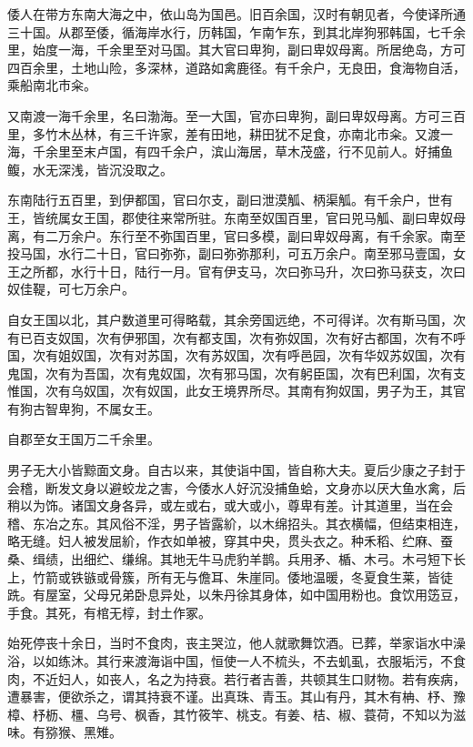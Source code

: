 \documentclass[12pt,UTF8]{ctexbook}
\begin{document}
倭人在带方东南大海之中，依山岛为国邑。旧百余国，汉时有朝见者，今使译所通三十国。从郡至倭，循海岸水行，历韩国，乍南乍东，到其北岸狗邪韩国，七千余里，始度一海，千余里至对马国。其大官曰卑狗，副曰卑奴母离。所居绝岛，方可四百余里，土地山险，多深林，道路如禽鹿径。有千余户，无良田，食海物自活，乘船南北市籴。

又南渡一海千余里，名曰渤海。至一大国，官亦曰卑狗，副曰卑奴母离。方可三百里，多竹木丛林，有三千许家，差有田地，耕田犹不足食，亦南北市籴。又渡一海，千余里至末卢国，有四千余户，滨山海居，草木茂盛，行不见前人。好捕鱼鳆，水无深浅，皆沉没取之。

东南陆行五百里，到伊都国，官曰尔支，副曰泄漠觚、柄渠觚。有千余户，世有王，皆统属女王国，郡使往来常所驻。东南至奴国百里，官曰兕马觚、副曰卑奴母离，有二万余户。东行至不弥国百里，官曰多模，副曰卑奴母离，有千余家。南至投马国，水行二十日，官曰弥弥，副曰弥弥那利，可五万余户。南至邪马壹国，女王之所都，水行十日，陆行一月。官有伊支马，次曰弥马升，次曰弥马获支，次曰奴佳鞮，可七万余户。

自女王国以北，其户数道里可得略载，其余旁国远绝，不可得详。次有斯马国，次有已百支奴国，次有伊邪国，次有都支国，次有弥奴国，次有好古都国，次有不呼国，次有姐奴国，次有对苏国，次有苏奴国，次有呼邑园，次有华奴苏奴国，次有鬼国，次有为吾国，次有鬼奴国，次有邪马国，次有躬臣国，次有巴利国，次有支惟国，次有乌奴国，次有奴国，此女王境界所尽。其南有狗奴国，男子为王，其官有狗古智卑狗，不属女王。

自郡至女王国万二千余里。

男子无大小皆黥面文身。自古以来，其使诣中国，皆自称大夫。夏后少康之子封于会稽，断发文身以避蛟龙之害，今倭水人好沉没捕鱼蛤，文身亦以厌大鱼水禽，后稍以为饰。诸国文身各异，或左或右，或大或小，尊卑有差。计其道里，当在会稽、东冶之东。其风俗不淫，男子皆露紒，以木绵招头。其衣横幅，但结束相连，略无缝。妇人被发屈紒，作衣如单被，穿其中央，贯头衣之。种禾稻、纻麻、蚕桑、缉绩，出细纻、缣绵。其地无牛马虎豹羊鹊。兵用矛、楯、木弓。木弓短下长上，竹箭或铁镞或骨簇，所有无与儋耳、朱崖同。倭地温暖，冬夏食生莱，皆徒跣。有屋室，父母兄弟卧息异处，以朱丹徐其身体，如中国用粉也。食饮用笾豆，手食。其死，有棺无椁，封土作冢。

始死停丧十余日，当时不食肉，丧主哭泣，他人就歌舞饮酒。已葬，举家诣水中澡浴，以如练沐。其行来渡海诣中国，恒使一人不梳头，不去虮虱，衣服垢污，不食肉，不近妇人，如丧人，名之为持衰。若行者吉善，共顿其生口财物。若有疾病，遭暴害，便欲杀之，谓其持衰不谨。出真珠、青玉。其山有丹，其木有柟、杼、豫樟、杼枥、橿、乌号、枫香，其竹筱竿、桃支。有姜、桔、椒、蓑荷，不知以为滋味。有猕猴、黑雉。
\end{document}
